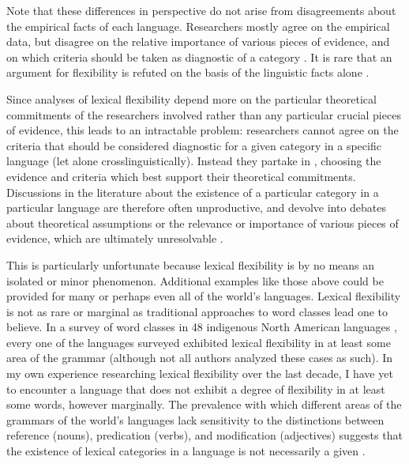 Note that these differences in perspective do not arise from disagreements about the empirical facts of each language. Researchers mostly agree on the empirical data, but disagree on the relative importance of various pieces of evidence, and on which criteria should be taken as diagnostic of a category .  It is rare that an argument for flexibility is refuted on the basis of the linguistic facts alone .

Since analyses of lexical flexibility depend more on the particular theoretical commitments of the researchers involved rather than any particular crucial pieces of evidence, this leads to an intractable problem: researchers cannot agree on the criteria that should be considered diagnostic for a given category in a specific language (let alone crosslinguistically). Instead they partake in  , choosing the evidence and criteria which best support their theoretical commitments. Discussions in the literature about the existence of a particular category in a particular language are therefore often unproductive, and devolve into debates about theoretical assumptions or the relevance or importance of various pieces of evidence, which are ultimately unresolvable .

This is particularly unfortunate because lexical flexibility is by no means an isolated or minor phenomenon. Additional examples like those above could be provided for many or perhaps even all of the world's languages. Lexical flexibility is not as rare or marginal as traditional approaches to word classes lead one to believe. In a survey of word classes in 48 indigenous North American languages , every one of the languages surveyed exhibited lexical flexibility in at least some area of the grammar (although not all authors analyzed these cases as such). In my own experience researching lexical flexibility over the last decade, I have yet to encounter a language that does not exhibit a degree of flexibility in at least some words, however marginally. The prevalence with which different areas of the grammars of the world's languages lack sensitivity to the distinctions between reference (nouns), predication (verbs), and modification (adjectives) suggests that the existence of lexical categories in a language is not necessarily a given .

